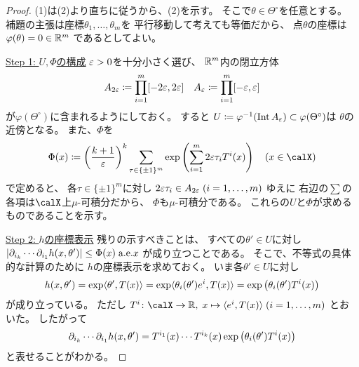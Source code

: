 \documentclass[report]{jlreq}
\begin{document}
\begin{proof}
    (1)は(2)より直ちに従うから、(2)を示す。
    そこで$\theta \in \Theta^\circ$を任意とする。
    補題の主張は座標$\theta_1, \dots, \theta_m$を
    平行移動して考えても等価だから、
    点$\theta$の座標は
    $\varphi(\theta) = 0 \in \mathbb{R}^m$
    であるとしてよい。

    \uline{Step 1: $U, \Phi$の構成} \quad
    $\varepsilon > 0$を十分小さく選び、
    $\mathbb{R}^m$内の閉立方体
    \begin{alignat}{1}
        A_{2\varepsilon}
            \coloneqq
            \prod_{i = 1}^m [- 2\varepsilon, 2\varepsilon]
        \quad
        A_{\varepsilon}
            \coloneqq
            \prod_{i = 1}^m [- \varepsilon, \varepsilon]
    \end{alignat}
    が$\varphi(\Theta^\circ)$に含まれるようにしておく。
    すると
    $U \coloneqq \varphi^{-1}(\operatorname{Int} A_{\varepsilon})
        \subset \varphi(\Theta^\circ)$は
    $\theta$の近傍となる。
    また、$\Phi$を
    \begin{equation}
        \Phi(x) \coloneqq
            \myparen{
                \frac{k + 1}{\eps}
            }^k
            \sum_{\tau \in \{ \pm 1 \}^m}
                \exp\myparen{
                    \sum_{i = 1}^m
                    2\eps \tau_i T^i(x)
                }
            \quad
            (x \in \calX)
    \end{equation}
    で定めると、
    各$\tau \in \{ \pm 1 \}^m$に対し
    $2\varepsilon\tau_i \in A_{2\varepsilon} \; (i = 1, \dots, m)$
    ゆえに
    右辺の$\sum$の各項は$\calX$上$\mu$-可積分だから、
    $\Phi$も$\mu$-可積分である。
    これらの$U$と$\Phi$が求めるものであることを示す。

    \uline{Step 2: $h$の座標表示} \quad
    残りの示すべきことは、
    すべての$\theta' \in U$に対し
    $\left|{
        \partial_{i_k} \cdots \partial_{i_1} h(x, \theta')
    }\right| \le \Phi(x) \; \text{a.e.$x$}$
    が成り立つことである。
    そこで、不等式の具体的な計算のために
    $h$の座標表示を求めておく。
    いま各$\theta' \in U$に対し
    \begin{equation}
        h(x, \theta')
            = \exp\langle \theta', T(x) \rangle
            = \exp\langle \theta_i(\theta') e^i, T(x) \rangle
            = \exp\left({\theta_i(\theta') T^i(x)}\right)
    \end{equation}
    が成り立っている。
    ただし
        $T^i \colon \calX \to \R, \;
        x \mapsto \langle e^i, T(x) \rangle \;
        (i = 1, \dots, m)$
    とおいた。
    したがって
    \begin{equation}
        \locallabel{eq:partial-derivative-of-h}
        \del_{i_k} \cdots \del_{i_1} h(x, \theta')
            = T^{i_1}(x) \cdots T^{i_k}(x)
                \exp\myparen{\theta_i(\theta') T^i(x)}
    \end{equation}
    と表せることがわかる。


\end{proof}
\end{document}
